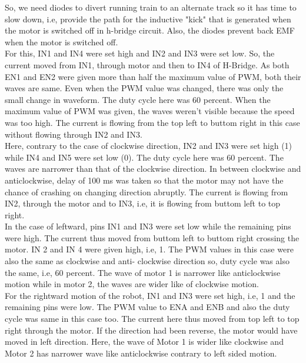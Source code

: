 So, we need diodes to divert running train to an alternate track so it has time to slow down, i.e, provide the path for the inductive "kick" that is generated when the motor is switched off in h-bridge circuit. Also, the diodes prevent back EMF when the motor is switched off.\\
For this, IN1 and IN4 were set high and IN2 and IN3 were set low. So, the current moved from IN1, through motor and then to IN4 of H-Bridge. As both EN1 and EN2 were given more than half the maximum value of PWM, both their waves are same. Even when the PWM value was changed, there was only the small change in waveform. The duty cycle here was 60 percent.  When the maximum value of PWM was given, the waves weren’t visible because the speed was too high. The current is flowing from the top left to buttom right in this case without flowing through IN2 and IN3. \\
Here, contrary to the case of clockwise direction, IN2 and IN3 were set high (1) while IN4 and IN5 were set low (0). The duty cycle here was 60 percent. The waves are narrower than that of the clockwise direction. In between clockwise and anticlockwise, delay of 100 ms was taken so that the motor may not have the chance of crashing on changing direction abruptly. The current is flowing from IN2, through the motor and to IN3, i.e, it is flowing from buttom left to top right.\\
In the case of leftward, pins IN1 and IN3 were set low while the remaining pins were high. The current thus moved from buttom left to buttom  right crossing the motor. IN 2 and IN 4 were given high, i.e, 1. The PWM values in this case were also the same as clockwise and anti- clockwise direction so, duty cycle was also the same, i.e, 60 percent. The wave of motor 1 is narrower like anticlockwise motion while in motor 2, the waves are wider like of clockwise motion.\\
For the rightward motion of the robot, IN1 and IN3 were set high, i.e, 1 and the remaining pins were low. The PWM value to ENA and ENB and also the duty cycle was same in this case too. The current here thus moved from top left to top right through the motor. If the direction had been reverse, the motor would have moved in left direction. Here, the wave of Motor 1 is wider like clockwise and Motor 2 has narrower wave like anticlockwise contrary to left sided motion.\\



